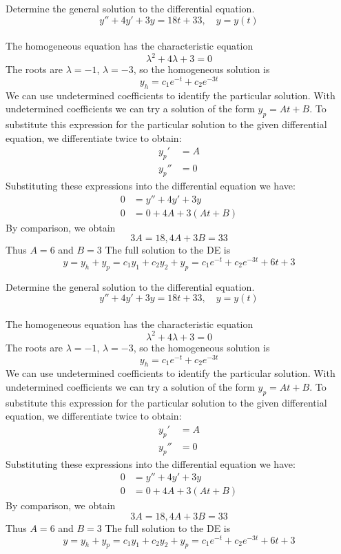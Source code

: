 \ifnum {}
\question[7] Determine the general solution to the differential equation. 
$$y'' +4y'+3y = 18t+33, \quad y=y(t)$$
\ifnum {} {\color{DarkBlue} \\[12pt] 
The homogeneous equation has the characteristic equation
$$\lambda ^2+4\lambda + 3 = 0$$
The roots are $\lambda= -1$, $\lambda = -3$, so the homogeneous solution is
$$y_h = c_1 e^{-t} + c_2 e^{-3t} $$
We can use undetermined coefficients to identify the particular solution. With undetermined coefficients we can try a solution of the form $y_p = At+B$. To substitute this expression for the particular solution to the given differential equation, we differentiate twice to obtain:
\begin{align}
    y_p ' &=  A \\
    y_p'' &= 0
\end{align}
Substituting these expressions into the differential equation we have:
\begin{align}
    0 &= y'' + 4y' + 3y \\
    0 &= 0 + 4A +3(At+B)
\end{align}
By comparison, we obtain
$$ 3A = 18, 4A+3B = 33$$
Thus $A=6$ and $B=3$
The full solution to the DE is
$$y = y_h + y_p = c_1y_1  + c_2y_2 + y_p = c_1e^{-t} + c_2 e^{-3t} + 6t+3$$
} 
\else 
\vspace{3cm}
\fi
\fi 

\ifnum {}
\question[7] Determine the general solution to the differential equation. 
$$y'' +4y'+3y = 18t+33, \quad y=y(t)$$
\ifnum {} {\color{DarkBlue} \\[12pt] 
The homogeneous equation has the characteristic equation
$$\lambda ^2+4\lambda + 3 = 0$$
The roots are $\lambda= -1$, $\lambda = -3$, so the homogeneous solution is
$$y_h = c_1 e^{-t} + c_2 e^{-3t} $$
We can use undetermined coefficients to identify the particular solution. With undetermined coefficients we can try a solution of the form $y_p = At+B$. To substitute this expression for the particular solution to the given differential equation, we differentiate twice to obtain:
\begin{align}
    y_p ' &=  A \\
    y_p'' &= 0
\end{align}
Substituting these expressions into the differential equation we have:
\begin{align}
    0 &= y'' + 4y' + 3y \\
    0 &= 0 + 4A +3(At+B)
\end{align}
By comparison, we obtain
$$ 3A = 18, 4A+3B = 33$$
Thus $A=6$ and $B=3$
The full solution to the DE is
$$y = y_h + y_p = c_1y_1  + c_2y_2 + y_p = c_1e^{-t} + c_2 e^{-3t} + 6t+3$$
} 
\else 
\vspace{3cm}
\fi
\fi 


